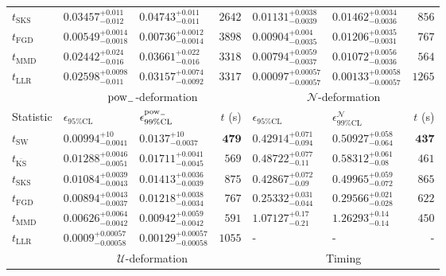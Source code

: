 \begin{tabular}{l|llr|llr}
	$t_{\mathrm{SKS}}$ & $0.03457_{-0.012}^{+0.011}$ & $0.04743_{-0.011}^{+0.011}$ & $2642$ & $0.01131_{-0.0039}^{+0.0038}$ & $0.01462_{-0.0036}^{+0.0034}$ & $856$ \\
	$t_{\mathrm{FGD}}$ & ${\mathbf{0.00549_{-0.0018}^{+0.0014}}}$ & ${\mathbf{0.00736_{-0.0014}^{+0.0012}}}$ & $3898$ & $0.00904_{-0.0035}^{+0.004}$ & $0.01206_{-0.0031}^{+0.0035}$ & $767$ \\
	$t_{\mathrm{MMD}}$ & $0.02442_{-0.016}^{+0.024}$ & $0.03661_{-0.016}^{+0.022}$ & $3318$ & ${\mathbf{0.00794_{-0.0037}^{+0.0059}}}$ & ${\mathbf{0.01072_{-0.0036}^{+0.0056}}}$ & $564$ \\
	$t_{\mathrm{LLR}}$ & $0.02598_{-0.011}^{+0.0098}$ & $0.03157_{-0.0092}^{+0.0074}$ & $3317$ & $0.00097_{-0.00057}^{+0.00057}$ & $0.00133_{-0.00057}^{+0.00058}$ & $1265$ \\
	\toprule
	\multicolumn{1}{c}{} & \multicolumn{3}{c}{$\rm{pow}_{-}$-deformation} & \multicolumn{3}{c}{$\mathcal{N}$-deformation} \\
	Statistic & $\epsilon_{95\%\mathrm{CL}}$ & $\epsilon^  {\rm{pow}_{-}}_{99\%\mathrm{CL}}$ & $t$ (s) & $\epsilon_{95\%\mathrm{CL}}$ & $\epsilon^    {\mathcal{N}}_{99\%\mathrm{CL}}$ & $t$ (s) \\
	\midrule
	$t_{\mathrm{SW}}$ & $0.00994_{-0.0041}^{+10}$ & $0.0137_{-0.0037}^{+10}$ & ${\mathbf{479}}$ & $0.42914_{-0.094}^{+0.071}$ & $0.50927_{-0.064}^{+0.058}$ & ${\mathbf{437}}$ \\
	$t_{\overline{\mathrm{KS}}}$ & $0.01288_{-0.0051}^{+0.0046}$ & $0.01711_{-0.0045}^{+0.0041}$ & $569$ & $0.48722_{-0.11}^{+0.077}$ & $0.58312_{-0.08}^{+0.061}$ & $461$ \\
	$t_{\mathrm{SKS}}$ & $0.01084_{-0.0043}^{+0.0039}$ & $0.01413_{-0.0039}^{+0.0036}$ & $875$ & $0.42867_{-0.09}^{+0.072}$ & $0.49965_{-0.072}^{+0.059}$ & $865$ \\
	$t_{\mathrm{FGD}}$ & $0.00894_{-0.0037}^{+0.0043}$ & $0.01218_{-0.0034}^{+0.0038}$ & $767$ & ${\mathbf{0.25332_{-0.044}^{+0.031}}}$ & ${\mathbf{0.29566_{-0.028}^{+0.021}}}$ & $622$ \\
	$t_{\mathrm{MMD}}$ & ${\mathbf{0.00626_{-0.0042}^{+0.0064}}}$ & ${\mathbf{0.00942_{-0.0042}^{+0.0059}}}$ & $591$ & $1.07127_{-0.21}^{+0.17}$ & $1.26293_{-0.14}^{+0.14}$ & $450$ \\
	$t_{\mathrm{LLR}}$ & $0.0009_{-0.00058}^{+0.00057}$ & $0.00129_{-0.00058}^{+0.00057}$ & $1055$ & - & - & - \\
	\toprule
	\multicolumn{1}{c}{} & \multicolumn{3}{c}{$\mathcal{U}$-deformation} & \multicolumn{3}{c}{Timing} \\

\end{tabular}

